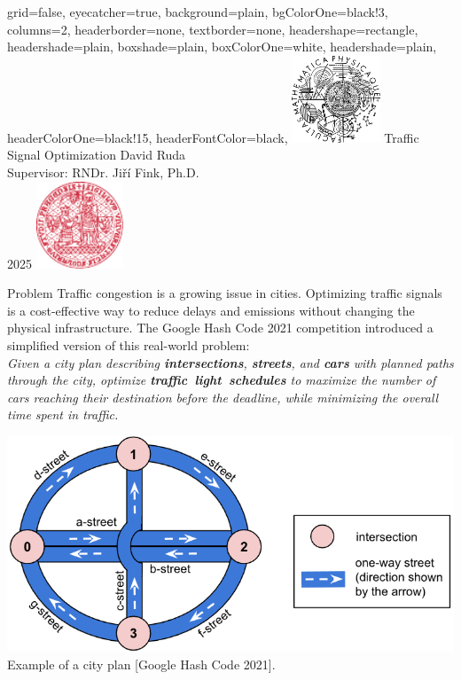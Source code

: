\documentclass[portrait,a0paper,fontscale=0.28]{baposter}
\begin{document}
\color{black!80} %
\begin{poster}{grid=false,
	eyecatcher=true,
	background=plain,
	bgColorOne=black!3, %
	columns=2,
	headerborder=none,
	textborder=none,
	headershape=rectangle,
	headershade=plain,
	boxshade=plain,
	boxColorOne=white,
	headershade=plain,
	headerColorOne=black!15, %
	headerFontColor=black,
	}%
	{\includegraphics[height=7em]{logos/mff-black.pdf}}
	{\vspace{-0.5ex} Traffic Signal Optimization}
	{\vspace{1ex} {\LARGE David Ruda} \\ Supervisor: RNDr. Jiří Fink, Ph.D. \\ \vspace{0.5ex} 2025}
	{\includegraphics[height=7em]{logos/uk-red.pdf}}


%
%

\begin{posterbox}[column=0,name=background]
{Problem}
Traffic congestion is a growing issue in cities. Optimizing traffic signals is a cost-effective way to reduce delays and emissions without changing the physical infrastructure. The Google Hash Code 2021 competition introduced a simplified version of this real-world problem: \\

\textit{Given a city plan describing \textbf{intersections}, \textbf{streets}, and \textbf{cars} with planned paths through the city, optimize \textbf{\mbox{traffic light schedules}} to
maximize the number of cars reaching their destination before the deadline, while minimizing the overall time spent in traffic.}

\begin{center}
\includegraphics[width=1.0\linewidth]{img/figure1.png}
\small{Example of a city plan {[Google Hash Code 2021]}.}
\end{center}
\end{posterbox}


\end{poster}
\end{document}
